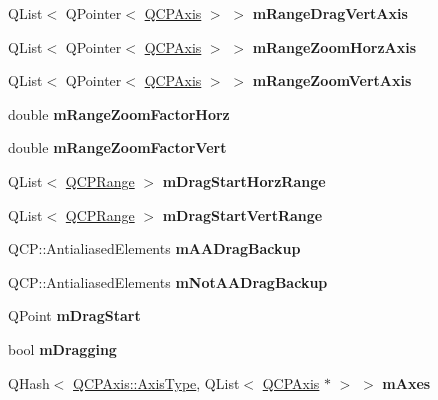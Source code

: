 \begin{DoxyCompactItemize}
Q\+List$<$ Q\+Pointer$<$ \mbox{\hyperlink{class_q_c_p_axis}{Q\+C\+P\+Axis}} $>$ $>$ {\bfseries m\+Range\+Drag\+Vert\+Axis}
\item 
\mbox{\label{class_q_c_p_axis_rect_aa35eeb02f68b63f2069fcc80c9334b91}} 
Q\+List$<$ Q\+Pointer$<$ \mbox{\hyperlink{class_q_c_p_axis}{Q\+C\+P\+Axis}} $>$ $>$ {\bfseries m\+Range\+Zoom\+Horz\+Axis}
\item 
\mbox{\label{class_q_c_p_axis_rect_aafb0e243294c158668499fd62cee057c}} 
Q\+List$<$ Q\+Pointer$<$ \mbox{\hyperlink{class_q_c_p_axis}{Q\+C\+P\+Axis}} $>$ $>$ {\bfseries m\+Range\+Zoom\+Vert\+Axis}
\item 
\mbox{\label{class_q_c_p_axis_rect_ad08d0250ed7b99de387d0ea6c7fd4dc1}} 
double {\bfseries m\+Range\+Zoom\+Factor\+Horz}
\item 
\mbox{\label{class_q_c_p_axis_rect_a32f063629581d5bf82b12769940b34ad}} 
double {\bfseries m\+Range\+Zoom\+Factor\+Vert}
\item 
\mbox{\label{class_q_c_p_axis_rect_a274aef08c4de084a3f26c3e92fac3a79}} 
Q\+List$<$ \mbox{\hyperlink{class_q_c_p_range}{Q\+C\+P\+Range}} $>$ {\bfseries m\+Drag\+Start\+Horz\+Range}
\item 
\mbox{\label{class_q_c_p_axis_rect_ab362ee8f71a156d812a1ea793a1e42cb}} 
Q\+List$<$ \mbox{\hyperlink{class_q_c_p_range}{Q\+C\+P\+Range}} $>$ {\bfseries m\+Drag\+Start\+Vert\+Range}
\item 
\mbox{\label{class_q_c_p_axis_rect_aa4a24f76360cfebe1bcf17a77fa7521b}} 
Q\+C\+P\+::\+Antialiased\+Elements {\bfseries m\+A\+A\+Drag\+Backup}
\item 
\mbox{\label{class_q_c_p_axis_rect_a6fcb12e052e276d57efbb128be31d6f5}} 
Q\+C\+P\+::\+Antialiased\+Elements {\bfseries m\+Not\+A\+A\+Drag\+Backup}
\item 
\mbox{\label{class_q_c_p_axis_rect_a032896b28f83a58010d8d533b78c49df}} 
Q\+Point {\bfseries m\+Drag\+Start}
\item 
\mbox{\label{class_q_c_p_axis_rect_ab49a6698194cf0e9e38a1d734c0888a8}} 
bool {\bfseries m\+Dragging}
\item 
\mbox{\label{class_q_c_p_axis_rect_afe7a24d2a2bea98fc552fa826350ba81}} 
Q\+Hash$<$ \mbox{\hyperlink{class_q_c_p_axis_ae2bcc1728b382f10f064612b368bc18a}{Q\+C\+P\+Axis\+::\+Axis\+Type}}, Q\+List$<$ \mbox{\hyperlink{class_q_c_p_axis}{Q\+C\+P\+Axis}} $\ast$ $>$ $>$ {\bfseries m\+Axes}
\end{DoxyCompactItemize}
